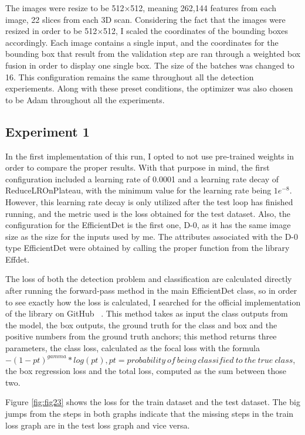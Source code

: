 The images were resize to be 512$\times$512, meaning 262,144 features from each image, 22 slices from each 3D scan. Considering the fact that the images were resized in order to be 512$\times$512, I scaled the coordinates of the bounding boxes
 accordingly. Each image contains a single input, and the coordinates for the bounding box that result from the validation step are ran through a weighted box fusion in order to display one single box. The size of the batches was changed to 16. This configuration remains the same throughout all the detection experiements. Along with these preset conditions, the optimizer was also chosen to be Adam throughout all the experiments.

\subsection{Experiment 1}

In the first implementation of this run, I opted to not use pre-trained weights in order to compare the proper results. With that purpose in mind, the first configuration included a learning rate of 0.0001 and a learning rate decay of ReduceLROnPlateau, with the minimum value for the learning rate being \(1e^{-8}\). However, this learning rate decay is only utilized after the test loop has finished running, and the metric used is the loss obtained for the test dataset. Also, the configuration for the EfficientDet is the first one, D-0, as it has the same image size as the size for the inputs used by me. The attributes associated with the D-0 type EfficientDet were obtained by calling the proper function from the library Effdet. 

The loss of both the detection problem and classification are calculated directly after running the forward-pass method in the main EfficientDet class, so in order to see exactly how the loss is calculated, I searched for the official implementation of the library on GitHub ~\cite{link7}. This method takes as input the class outputs from the model, the box outputs, the ground truth for the class and box and the positive numbers from the ground truth anchors; this method returns three parameters, the class loss, calculated as the focal loss with the formula \(-(1-pt)^{gamma} * log(pt), pt=probability\ of\ being\ classified\ to\ the\ true\ class\), the box regression loss and the total loss, computed as the sum between those two.

Figure \ref{fig:fig23} shows the loss for the train dataset and the test dataset. The big jumps from the steps in both graphs indicate that the missing steps in the train loss graph are in the test loss graph and vice versa. 

